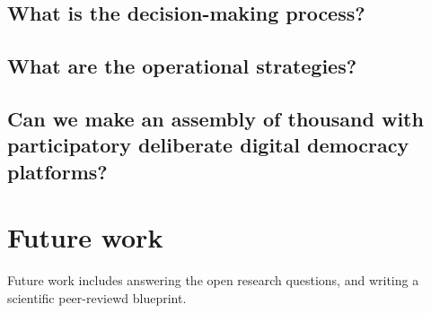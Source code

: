 \documentclass{IEEEtran}
\begin{document}
\subsection{What is the decision-making process?}


\subsection{What are the operational strategies?}


\subsection{Can we make an assembly of thousand with participatory deliberate digital democracy platforms?}



\section{Future work}
Future work includes answering the open research questions, and writing a scientific peer-reviewd blueprint.

\clearpage
\newpage


\printbibliography


% 
\end{document}
